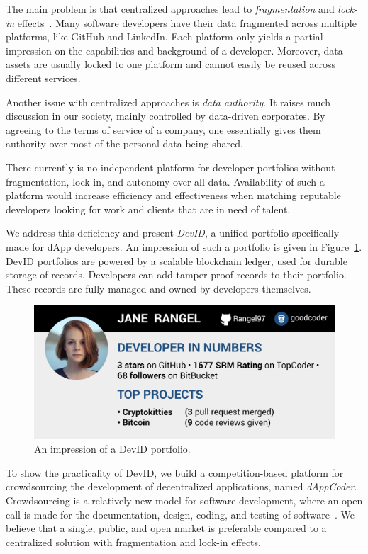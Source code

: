 The main problem is that centralized approaches lead to \emph{fragmentation} and \emph{lock-in} effects~\cite{pouwelse2017laws}.
Many software developers have their data fragmented across multiple platforms, like GitHub and LinkedIn.
Each platform only yields a partial impression on the capabilities and background of a developer.
Moreover, data assets are usually locked to one platform and cannot easily be reused across different services.

Another issue with centralized approaches is \emph{data authority}.
It raises much discussion in our society, mainly controlled by data-driven corporates.
By agreeing to the terms of service of a company, one essentially gives them authority over most of the personal data being shared.

There currently is no independent platform for developer portfolios without fragmentation, lock-in, and autonomy over all data.
Availability of such a platform would increase efficiency and effectiveness when matching reputable developers looking for work and clients that are in need of talent.

We address this deficiency and present \emph{DevID}, a unified portfolio specifically made for dApp developers.
An impression of such a portfolio is given in Figure~\ref{fig:devid}.
DevID portfolios are powered by a scalable blockchain ledger, used for durable storage of records.
Developers can add tamper-proof records to their portfolio.
These records are fully managed and owned by developers themselves.

\begin{figure}[t]
	\includegraphics[width=\columnwidth]{devid/resources/devid_smaller.jpeg}
	\caption{An impression of a DevID portfolio.}
	\label{fig:devid}
\end{figure}

To show the practicality of DevID, we build a competition-based platform for crowdsourcing the development of decentralized applications, named \emph{dAppCoder}.
Crowdsourcing is a relatively new model for software development, where an open call is made for the documentation, design, coding, and testing of software~\cite{latoza2016crowdsourcing}.
We believe that a single, public, and open market is preferable compared to a centralized solution with fragmentation and lock-in effects.

